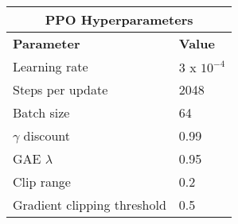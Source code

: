 \begin{table}[h]
\begin{tabular}{|l|l|}
\hline
\multicolumn{2}{|c|}{\textbf{PPO Hyperparameters}} \\ \hline
\textbf{Parameter} & \textbf{Value} \\ \hline
Learning rate & $3 \text{ x } 10^{-4}$ \\ \hline
Steps per update & 2048 \\ \hline
Batch size & 64 \\ \hline
$\gamma$ discount & 0.99 \\ \hline
GAE $\lambda$ & 0.95 \\ \hline
Clip range & 0.2 \\ \hline
Gradient clipping threshold & 0.5 \\ \hline
\end{tabular}
\end{table}